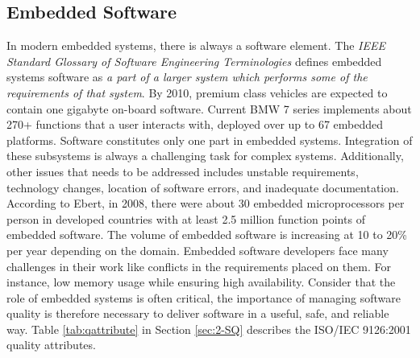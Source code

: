 \subsection{Embedded Software}
In modern embedded systems, there is always a software element. The \textit{IEEE Standard Glossary of Software Engineering Terminologies} defines embedded systems software as \textit{a part of a larger system which performs some of the requirements of that system}\cite{radatz1990ieee}. By 2010, premium class vehicles are expected to contain one gigabyte on-board software\cite{pretschner2007software,ebert2009embedded}. Current BMW 7 series implements about 270+ functions that a user interacts with, deployed over up to 67 embedded platforms\cite{pretschner2007software}. Software constitutes only one part in embedded systems. Integration of these subsystems is always a challenging task for complex systems\cite{pretschner2007software}. Additionally, other issues that needs to be addressed includes unstable requirements, technology changes, location of software errors, and inadequate documentation\cite{jimenez2013introduction}. According to Ebert, in 2008, there were about 30 embedded microprocessors per person in developed countries with at least 2.5 million function points of embedded software. The volume of embedded software is increasing at 10 to 20\% per year depending on the domain\cite{ebert2009embedded}. Embedded software developers face many challenges in their work like conflicts in the requirements placed on them. For instance, low memory usage while ensuring high availability\cite{vulgarakis2008embedded}. Consider that the role of embedded systems is often critical, the importance of managing software quality is therefore necessary to deliver software in a useful, safe, and reliable way. Table \ref{tab:qattribute} in Section \ref{sec:2-SQ} describes the ISO/IEC 9126:2001 quality attributes.


